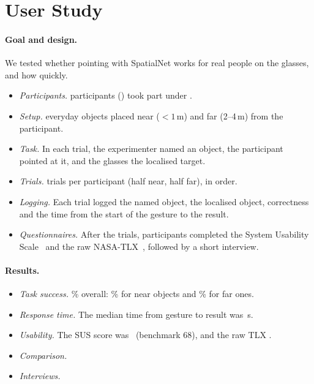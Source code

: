 \section{User Study}\label{sec:study}


\paragraph{Goal and design.} We tested whether pointing with SpatialNet works for real people on the glasses, and how quickly.
\begin{itemize}
\item \emph{Participants.}  participants () took part under .
\item \emph{Setup.}  everyday objects placed near (${<}1$\,m) and far (2--4\,m) from the participant.
\item \emph{Task.} In each trial, the experimenter named an object, the participant pointed at it, and the glasses  the localised target.
\item \emph{Trials.}  trials per participant (half near, half far), in  order. 
\item \emph{Logging.} Each trial logged the named object, the localised object, correctness and the time from the start of the gesture to the result.
\item \emph{Questionnaires.} After the trials, participants completed the System Usability Scale~\cite{brooke1996sus} and the raw NASA-TLX~\cite{hart1988development}, followed by a short interview.
\end{itemize}

\paragraph{Results.}
\begin{itemize}
\item \emph{Task success.} \xx\% \tbd{[Wilson CI]} overall: \xx\% for near objects and \xx\% for far ones.
\item \emph{Response time.} The median time from gesture to result was \xx\,s.
\item \emph{Usability.} The SUS score was \xx\ (benchmark 68), and the raw TLX \xx.
\item \emph{Comparison.} 
\item \emph{Interviews.} 
\end{itemize}

